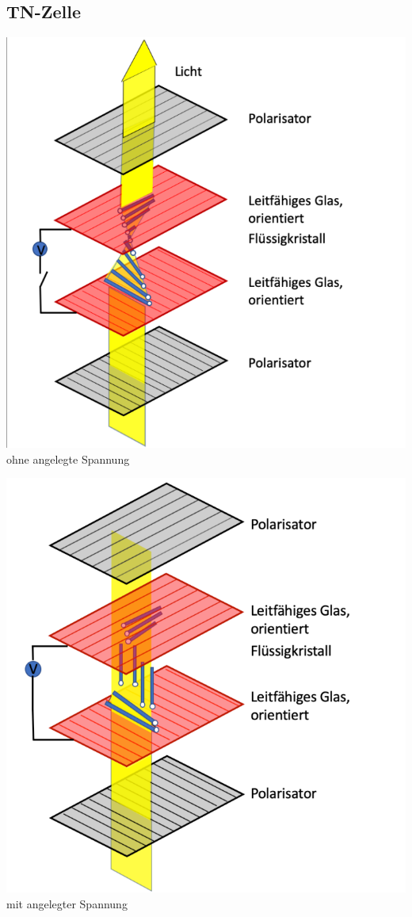 \subsection{TN-Zelle}
\begin{minipage}[t]{0.5\linewidth}
    \includegraphics[width=\linewidth]{pictures/TN-Zelle1.png}
    ohne angelegte Spannung
\end{minipage}
\begin{minipage}[t]{0.5\linewidth}
    \includegraphics[width=\linewidth]{pictures/TN-Zelle2.png} 
    mit angelegter Spannung 
\end{minipage}


